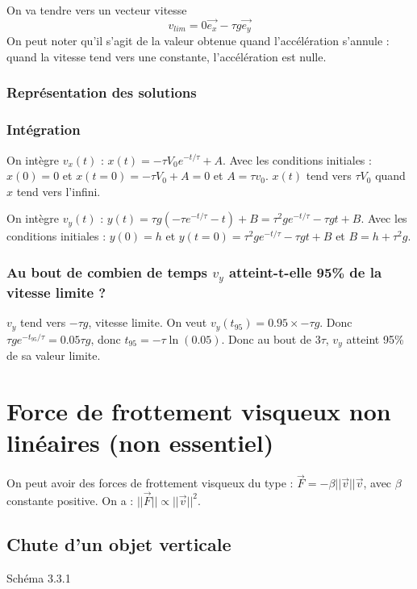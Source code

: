 \documentclass[french]{yLectureNote}
\renewcommand{\vec}{\overrightarrow}
\newcommand{\norm}[1]{||\vec{#1}||}
\begin{document}
On va tendre vers un vecteur vitesse \[v_{lim} = 0\vec{e_x} -\tau g \vec{e_y}\]
On peut noter qu’il s’agit de la valeur obtenue quand l’accélération s’annule : quand
la vitesse tend vers une constante, l’accélération est nulle. 
\subsubsection{Représentation des solutions}
\subsubsection{Intégration}
On intègre $v_x(t)$ : $x(t) = -\tau V_0e^{-t/\tau} + A$. Avec les conditions initiales : $x(0) = 0$ et $x(t=0) = -\tau V_0+A = 0 $ et $A = \tau v_0$. $x(t)$ tend vers $\tau V_0$ quand $x$ tend vers l'infini.

On intègre $v_y(t)$ : $y(t) = \tau g(-\tau e^{-t/\tau}-t) + B = \tau^2ge^{-t/\tau}-\tau g t + B$. Avec les conditions initiales : $y(0) = h$ et $y(t=0) = \tau^2ge^{-t/\tau}-\tau g t + B$ et $B = h + \tau^2g$.
\subsubsection{Au bout de combien de temps $v_y$ atteint-t-elle 95\% de la vitesse limite ?}
$v_y$ tend vers $-\tau g$, vitesse limite. On veut $v_y(t_{95}) =0.95\times -\tau g$. Donc $\tau g e^{-t_{95}/\tau} = 0.05\tau g$, donc $t_{95} = -\tau \ln(0.05)$. Donc au bout de $3\tau$, $v_y$ atteint 95\% de sa valeur limite.
\section{Force de frottement visqueux non linéaires (non essentiel)}
On peut avoir des forces de frottement visqueux du type : $\vec{F} = -\beta \norm{v}\vec{v}$, avec $\beta$ constante positive. On a : $\norm{F} \propto \norm{v}^2$.
\subsection{Chute d'un objet verticale}
Schéma 3.3.1
\end{document}
